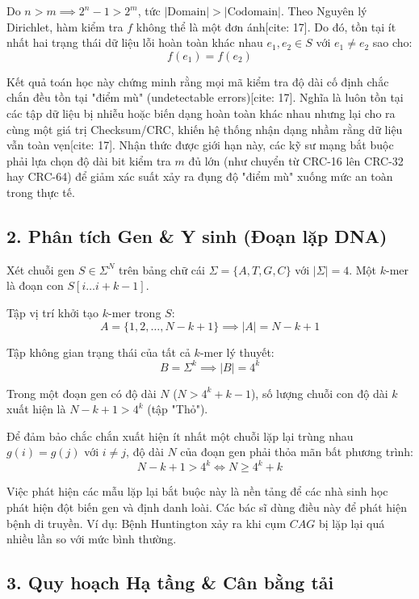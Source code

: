 \documentclass[12pt,a4paper]{article}
\theoremstyle{definition}
\begin{document}
\noindent Do $n > m \implies 2^n - 1 > 2^m$, tức $|\text{Domain}| > |\text{Codomain}|$. Theo Nguyên lý Dirichlet, hàm kiểm tra $f$ không thể là một đơn ánh[cite: 17]. Do đó, tồn tại ít nhất hai trạng thái dữ liệu lỗi hoàn toàn khác nhau $e_1, e_2 \in S$ với $e_1 \neq e_2$ sao cho:
\[
f(e_1) = f(e_2)
\]

\noindent Kết quả toán học này chứng minh rằng mọi mã kiểm tra độ dài cố định chắc chắn đều tồn tại "điểm mù" (undetectable errors)[cite: 17]. Nghĩa là luôn tồn tại các tập dữ liệu bị nhiễu hoặc biến dạng hoàn toàn khác nhau nhưng lại cho ra cùng một giá trị Checksum/CRC, khiến hệ thống nhận dạng nhầm rằng dữ liệu vẫn toàn vẹn[cite: 17]. Nhận thức được giới hạn này, các kỹ sư mạng bắt buộc phải lựa chọn độ dài bit kiểm tra $m$ đủ lớn (như chuyển từ CRC-16 lên CRC-32 hay CRC-64) để giảm xác suất xảy ra đụng độ "điểm mù" xuống mức an toàn trong thực tế.

\subsection*{2. Phân tích Gen \& Y sinh (Đoạn lặp DNA)}
Xét chuỗi gen $S \in \Sigma^N$ trên bảng chữ cái $\Sigma = \{A, T, G, C\}$ với $|\Sigma| = 4$. Một $k$-mer là đoạn con $S[i \dots i + k - 1]$.

\noindent Tập vị trí khởi tạo $k$-mer trong $S$:
\[
A = \{1, 2, \dots, N - k + 1\} \implies |A| = N - k + 1
\]

\noindent Tập không gian trạng thái của tất cả $k$-mer lý thuyết:
\[
B = \Sigma^k \implies |B| = 4^k
\]

\noindent Trong một đoạn gen có độ dài $N$ ($N > 4^k + k - 1$), số lượng chuỗi con độ dài $k$ xuất hiện là $N - k + 1 > 4^k$ (tập "Thỏ").

\noindent Để đảm bảo chắc chắn xuất hiện ít nhất một chuỗi lặp lại trùng nhau $g(i) = g(j)$ với $i \neq j$, độ dài $N$ của đoạn gen phải thỏa mãn bất phương trình:
\[
N - k + 1 > 4^k \iff N \ge 4^k + k
\]

\noindent Việc phát hiện các mẫu lặp lại bắt buộc này là nền tảng để các nhà sinh học phát hiện đột biến gen và định danh loài. Các bác sĩ dùng điều này để phát hiện bệnh di truyền. Ví dụ: Bệnh Huntington xảy ra khi cụm $CAG$ bị lặp lại quá nhiều lần so với mức bình thường.

\subsection*{3. Quy hoạch Hạ tầng \& Cân bằng tải}
\end{document}

